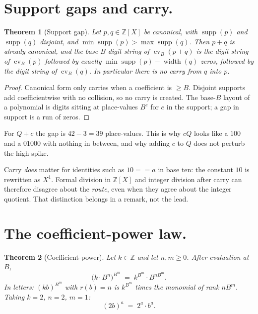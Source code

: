 \documentclass{article}
\DeclareMathOperator{\ev}{ev}
\DeclareMathOperator{\supp}{supp}
\newcommand{\ZZ}{\mathbb{Z}}
\newcommand{\rank}{r}
\newcommand{\eqc}{\mathrel{\mathtt{==}}}
\theoremstyle{plain}
\newtheorem{theorem}{Theorem}
\theoremstyle{definition}
\theoremstyle{remark}
\begin{document}
\section{Support gaps and carry.}
\label{sec:gaps}

\begin{theorem}[Support gap]
\label{thm:gap}
Let \(p,q \in \ZZ[X]\) be canonical, with \(\supp(p)\) and \(\supp(q)\)
disjoint, and \(\min\supp(p) > \max\supp(q)\). Then \(p+q\) is already
canonical, and the base-\(B\) digit string of \(\ev_B(p+q)\) is the digit
string of \(\ev_B(p)\) followed by exactly
\(\min\supp(p) - \operatorname{width}(q)\) zeros, followed by the digit string of
\(\ev_B(q)\). In particular there is no carry from \(q\) into \(p\).
\end{theorem}

\begin{proof}
Canonical form only carries when a coefficient is \(\ge B\). Disjoint
supports add coefficientwise with no collision, so no carry is created.
The base-\(B\) layout of a polynomial is digits sitting at place-values
\(B^e\) for \(e\) in the support; a gap in support is a run of zeros.
\end{proof}

For \(Q+c\) the gap is \(42-3=39\) place-values. This is why \(cQ\) looks
like a \(100\) and a \(01000\) with nothing in between, and why adding
\(c\) to \(Q\) does not perturb the high spike.

Carry \emph{does} matter for identities such as \(10 \eqc a\) in base ten:
the constant \(10\) is rewritten as \(X^1\). Formal division in
\(\ZZ[X]\) and integer division after carry can therefore disagree about
the \emph{route}, even when they agree about the integer quotient. That
distinction belongs in a remark, not the lead.

\section{The coefficient-power law.}
\label{sec:coeff}

\begin{theorem}[Coefficient-power]
\label{thm:coeff}
Let \(k \in \ZZ\) and let \(n,m \ge 0\). After evaluation at \(B\),
\[
\bigl(k \cdot B^n\bigr)^{B^m} \;=\; k^{B^m} \cdot B^{n B^m}.
\]
In letters: \((kb)^{B^m}\) with \(\rank(b)=n\) is \(k^{B^m}\) times the
monomial of rank \(n B^m\). Taking \(k=2\), \(n=2\), \(m=1\):
\[
(2b)^a \;=\; 2^a \cdot b^a.
\]
\end{theorem}
\end{document}

